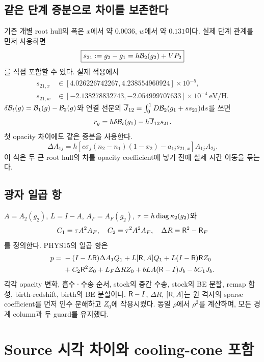 \subsection{같은 단계 증분으로 차이를 보존한다}
기존 개별 root hull의 폭은 $x$에서 약 $0.0036$, $w$에서 약 $0.131$이다. 실제 단계 관계를 먼저 사용하면
\begin{equation}
\boxed{s_{21}:=g_2-g_1=h\mathcal B_2(g_2)+VP_2}
\label{eq:stageinc}
\end{equation}
를 직접 포함할 수 있다. 실제 적용에서
\begin{align}
s_{21,x}&\in[4.026226742267,4.238554960924]\times10^{-5},\\
s_{21,w}&\in[-2.138278832743,-2.054999707633]\times10^{-4}\ \mathrm{eV/H}.
\label{eq:incbounds}
\end{align}
$\delta\mathcal B_t(g)=\mathcal B_1(g)-\mathcal B_2(g)$와 연결 선분의 $\overline J_{12}=\int_0^1D\mathcal B_2(g_1+s s_{21})\mathrm d s$를 쓰면
\begin{equation}
r_g=h\delta\mathcal B_t(g_1)-h\overline J_{12}s_{21}.
\label{eq:rg}
\end{equation}
첫 opacity 차이에도 같은 증분을 사용한다.
\begin{equation}
\boxed{\Delta A_{1j}
=h[c\sigma_j(n_2-n_1)(1-x_2)-a_{1j}s_{21,x}]A_{1j}A_{2j}.}
\label{eq:deltaA}
\end{equation}
이 식은 두 큰 root hull의 차를 opacity coefficient에 넣기 전에 실제 시간 이동을 묶는다.

\subsection{광자 일곱 항}
$A=A_2(g_2)$, $L=I-A$, $A_F=A_F(g_2)$, $\tau=h\operatorname{diag}\kappa_2(g_2)$와
\begin{equation}
C_1=\tau A^2A_F,\quad C_2=\tau^2A^2A_F,\quad
\Delta R=\mathsf R^2-\mathsf R_F
\label{eq:C12}
\end{equation}
를 정의한다. PHYS15의 일곱 항은
\begin{align}
p={}&-(I-L\mathsf R)\Delta A_1Q_1+L[\mathsf R,A]Q_1+L(I-\mathsf R)\mathsf R Z_0\notag\\
&+C_2\mathsf R^2Z_0+L_F\Delta RZ_0
+bLA(\mathsf R-I)J_b-bC_1J_b.
\label{eq:seven}
\end{align}
각각 opacity 변화, 흡수·수송 순서, stock의 중간 수송, stock의 BE 분할, remap 합성, birth-redshift, birth의 BE 분할이다. $\mathsf R-I$, $\Delta R$, $[\mathsf R,A]$는 원 격자의 sparse coefficient를 먼저 인수 분해하고 $Z_0$에 작용시켰다. 동일 $\rho$에서 $\rho^2$를 계산하며, 모든 경계 column과 두 guard를 유지했다.\cite{phys15,app16}

\section{Source 시각 차이와 cooling-cone 포함}\label{sec:cooling}
